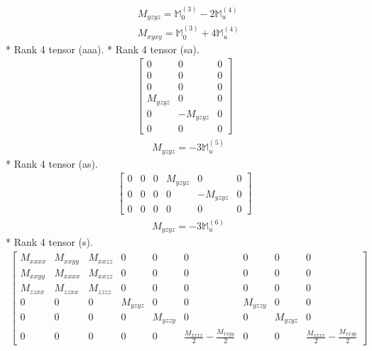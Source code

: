 \documentclass[fleqn,8pt,landscape]{jsarticle}
\begin{document}
\begin{align*}
& M_{yzyz} = \mathbb{M}_{0}^{(3)} - 2 \mathbb{M}_{u}^{(4)} \\
& M_{xyxy} = \mathbb{M}_{0}^{(3)} + 4 \mathbb{M}_{u}^{(4)}
\end{align*}
* Rank 4 tensor (aaa).
* Rank 4 tensor (sa).
\begin{align*}
\begin{bmatrix} 0 & 0 & 0 \\ 0 & 0 & 0 \\ 0 & 0 & 0 \\ M_{yzyz} & 0 & 0 \\ 0 & - M_{yzyz} & 0 \\ 0 & 0 & 0 \end{bmatrix}
\end{align*}
\begin{align*}
& M_{yzyz} = - 3 \mathbb{M}_{u}^{(5)}
\end{align*}
* Rank 4 tensor (as).
\begin{align*}
\begin{bmatrix} 0 & 0 & 0 & M_{yzyz} & 0 & 0 \\ 0 & 0 & 0 & 0 & - M_{yzyz} & 0 \\ 0 & 0 & 0 & 0 & 0 & 0 \end{bmatrix}
\end{align*}
\begin{align*}
& M_{yzyz} = - 3 \mathbb{M}_{u}^{(6)}
\end{align*}
* Rank 4 tensor (s).
\begin{align*}
\begin{bmatrix} M_{xxxx} & M_{xxyy} & M_{xxzz} & 0 & 0 & 0 & 0 & 0 & 0 \\ M_{xxyy} & M_{xxxx} & M_{xxzz} & 0 & 0 & 0 & 0 & 0 & 0 \\ M_{zzxx} & M_{zzxx} & M_{zzzz} & 0 & 0 & 0 & 0 & 0 & 0 \\ 0 & 0 & 0 & M_{yzyz} & 0 & 0 & M_{yzzy} & 0 & 0 \\ 0 & 0 & 0 & 0 & M_{yzzy} & 0 & 0 & M_{yzyz} & 0 \\ 0 & 0 & 0 & 0 & 0 & \frac{M_{xxxx}}{2} - \frac{M_{xxyy}}{2} & 0 & 0 & \frac{M_{xxxx}}{2} - \frac{M_{xxyy}}{2} \end{bmatrix}
\end{align*}
\end{document}
